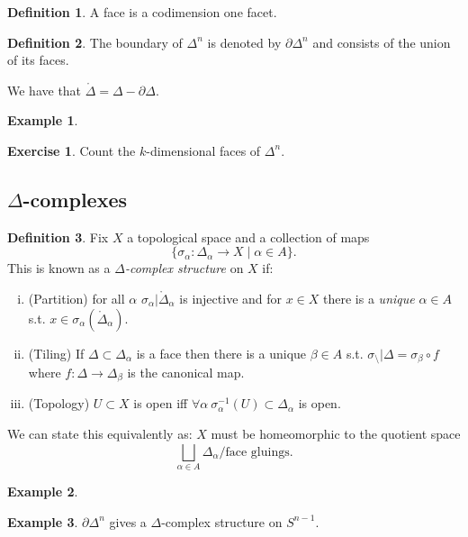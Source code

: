 \documentclass{article}
\theoremstyle{definition}
\newtheorem*{defn}{Definition}
\newtheorem*{ex}{Example}
\newtheorem*{exer}{Exercise}
\begin{document}
\begin{defn}
A face is a codimension one facet.
\end{defn}

\begin{defn}
The boundary of $\Delta^n$ is denoted by $\partial \Delta^n$ and consists of the union of its faces.
\end{defn}

We have that $\mathring{\Delta} =\Delta - \partial \Delta$.

\begin{ex}
\end{ex}

\begin{exer}
Count the $k$-dimensional faces of $\Delta^n$.
\end{exer}

\subsection{$\Delta$-complexes}
\begin{defn}
Fix $X$ a topological space and a collection of maps
\[\{\sigma_\alpha \colon \Delta_\alpha \to X \mid \alpha \in A\}.\]
This is known as a \emph{$\Delta$-complex structure} on $X$ if:
\begin{enumerate}[(i)]
\item (Partition) for all $\alpha$ $\sigma_\alpha|\mathring{\Delta}_\alpha$ is injective and for $x\in X$ there is a \emph{unique} $\alpha\in A$ s.t. $x\in\sigma_\alpha(\mathring{\Delta}_\alpha)$.
\item (Tiling) If $\Delta\subset \Delta_\alpha$ is a face then there is a unique $\beta\in A$ s.t. $\sigma_\setminus|\Delta = \sigma_\beta\circ f$ where $f \colon \Delta \to \Delta_\beta$ is the canonical map.
\item (Topology) $U\subset X$ is open iff $\forall \alpha\ \sigma^{-1}_\alpha (U) \subset \Delta_\alpha$ is open.
\end{enumerate}
\end{defn}

We can state this equivalently as: $X$ must be homeomorphic to the quotient space
\[\bigsqcup_{\alpha\in A} \Delta_\alpha / \text{face gluings}.\]

\begin{ex}
\end{ex}

\begin{ex}
$\partial \Delta^n$ gives a $\Delta$-complex structure on $S^{n-1}$.
\end{ex}
\end{document}
